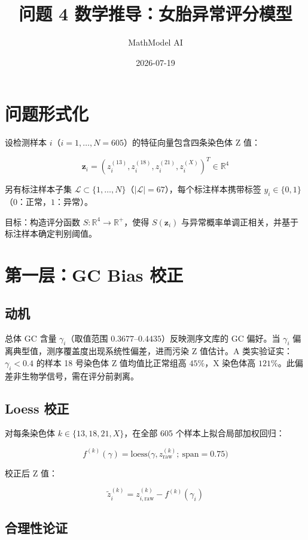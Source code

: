 \documentclass[UTF8]{ctexart}
\title{问题 4 数学推导：女胎异常评分模型}
\author{MathModel AI}
\date{2026-07-19}
\begin{document}
\maketitle

\section{问题形式化}

设检测样本 $i$（$i=1,\dots,N=605$）的特征向量包含四条染色体 Z 值：

\[
\mathbf{z}_i = (z_i^{(13)}, z_i^{(18)}, z_i^{(21)}, z_i^{(X)})^T \in \mathbb{R}^4
\]

另有标注样本子集 $\mathcal{L} \subset \{1,\dots,N\}$（$|\mathcal{L}|=67$），每个标注样本携带标签 $y_i \in \{0,1\}$（$0$：正常，$1$：异常）。

目标：构造评分函数 $S: \mathbb{R}^4 \to \mathbb{R}^+$，使得 $S(\mathbf{z}_i)$ 与异常概率单调正相关，并基于标注样本确定判别阈值。

\section{第一层：GC Bias 校正}

\subsection{动机}

总体 GC 含量 $\gamma_i$（取值范围 $0.3677$--$0.4435$）反映测序文库的 GC 偏好。当 $\gamma_i$ 偏离典型值，测序覆盖度出现系统性偏差，进而污染 Z 值估计。A 类实验证实：$\gamma_i < 0.4$ 的样本 18 号染色体 Z 值均值比正常组高 $45\%$，X 染色体高 $121\%$。此偏差非生物学信号，需在评分前剥离。

\subsection{Loess 校正}

对每条染色体 $k \in \{13,18,21,X\}$，在全部 605 个样本上拟合局部加权回归：

\[
f^{(k)}(\gamma) = \text{loess}\big(\gamma, z^{(k)}_{\text{raw}}; \ \text{span} = 0.75\big)
\]

校正后 Z 值：

\[
\tilde{z}_i^{(k)} = z_{i,\text{raw}}^{(k)} - f^{(k)}(\gamma_i)
\]

\subsection{合理性论证}
\end{document}
